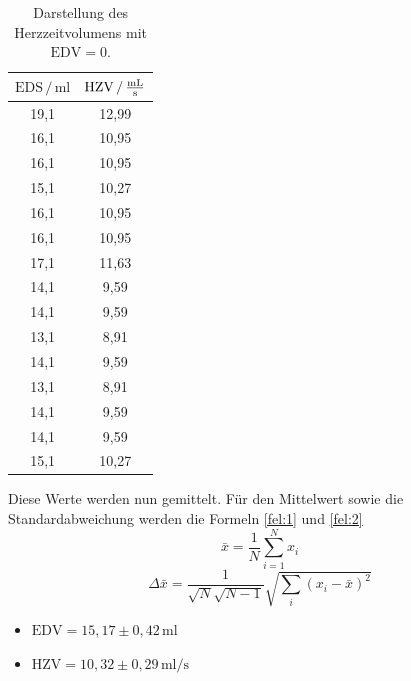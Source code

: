 \begin{table}[H]
  \centering
  \caption{Darstellung des Herzzeitvolumens mit $\text{EDV} =0$.}
  \label{tab:7}
  \begin{tabular}{c c}
    \toprule
     $\text{EDS}\,/\,\si{\milli\litre}$ &
     $\text{HZV} \,/\, \si[per-mode=fraction]{\milli\litre\per\second}$ \\
     \midrule
      19,1 & 12,99 \\
      16,1 & 10,95\\
      16,1 & 10,95\\
      15,1 & 10,27\\
      16,1 & 10,95\\
      16,1 & 10,95\\
      17,1 & 11,63\\
      14,1 & 9,59\\
      14,1 & 9,59\\
      13,1 & 8,91\\
      14,1 & 9,59\\
      13,1 & 8,91\\
      14,1 & 9,59\\
      14,1 & 9,59\\
      15,1 & 10,27\\
     \bottomrule
  \end{tabular}
\end{table}
Diese Werte werden nun gemittelt.
Für den Mittelwert sowie die Standardabweichung werden die Formeln \ref{fel:1} und \ref{fel:2}
\begin{equation}
    \bar{x} = \frac{1}{N} \sum_{i=1}^{N} x_i
    \label{fel:1}
\end{equation}
\begin{equation}
  \Delta \bar{x} = \frac{1}{\sqrt{N}\sqrt{N-1}} \sqrt{\sum_{i}(x_i-\bar{x})^2}
  \label{fel:2}
\end{equation}

\begin{itemize}
  \item $\text{EDV} = 15,17 \pm 0,42\, \si{\milli\litre}$
  \item $\text{HZV} = 10,32 \pm 0,29\, \si{\milli\litre\per\second}$
\end{itemize}
